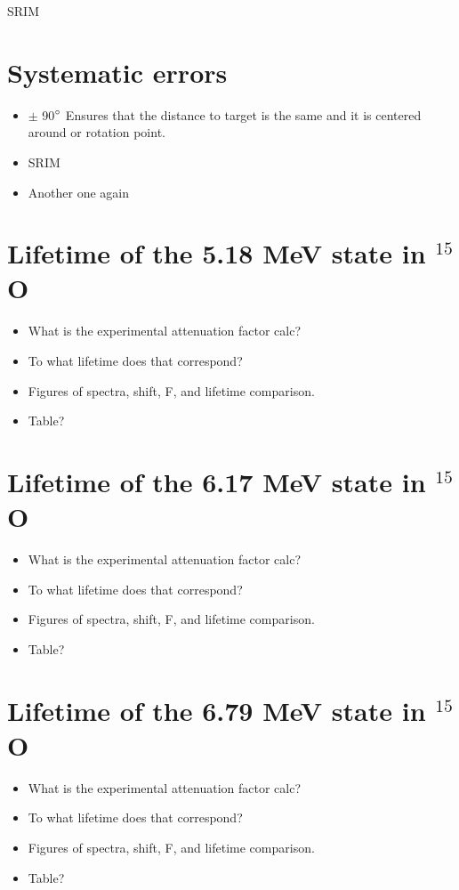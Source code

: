 SRIM \cite{Ziegler2010}


\section{Systematic errors}
\label{sec: systematicErrors}

\begin{itemize}
\item $\pm$ 90$\degree$ Ensures that the distance to target is the same and it is centered around or rotation point.
\item SRIM
\item Another one again
\end{itemize}

\section{Lifetime of the 5.18 MeV state in $^{15}$O}
\label{sec: lifetime518}

\begin{itemize}
\item What is the experimental attenuation factor calc?
\item To what lifetime does that correspond?
\item Figures of spectra, shift, F, and lifetime comparison.
\item Table?
\end{itemize}


\section{Lifetime of the 6.17 MeV state in $^{15}$O}
\label{sec: lifetime617}

\begin{itemize}
\item What is the experimental attenuation factor calc?
\item To what lifetime does that correspond?
\item Figures of spectra, shift, F, and lifetime comparison.
\item Table?
\end{itemize}


\section{Lifetime of the 6.79 MeV state in $^{15}$O}
\label{sec: lifetime679}

\begin{itemize}
\item What is the experimental attenuation factor calc?
\item To what lifetime does that correspond?
\item Figures of spectra, shift, F, and lifetime comparison.
\item Table?
\end{itemize}

%
% 
% 
